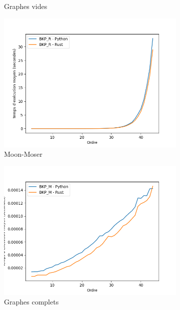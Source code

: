 \documentclass[12pt,a4paper]{article}
\begin{document}
\begin{figure}[h!]
\begin{subfigure}[b]{0.32\textwidth}
  \caption{Graphes vides}%
  \label{subfig:pr2_BKP_R_empty}
  \end{subfigure}
  \begin{subfigure}[b]{0.32\textwidth}
    \includegraphics[width=\textwidth]{images/total_BKP_R_new_pyrust_pivot_turan_plot.png}
  \caption{Moon-Moser}%
  \label{subfig:pr2_BKP_R_turan}
  \end{subfigure}
  \begin{subfigure}[b]{0.32\textwidth}
    \includegraphics[width=\textwidth]{images/total_BKP_M_new_pyrust_pivot_complete_plot.png}
  \caption{Graphes complets}%
  \label{subfig:pr2_BKP_M_complete}
  \end{subfigure}
  \begin{subfigure}[b]{0.32\textwidth}

\end{subfigure}
\end{figure}
\end{document}
